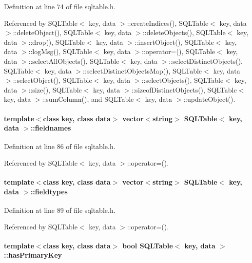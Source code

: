 Definition at line 74 of file sqltable.h.

Referenced by SQLTable$<$ key, data $>$::create\-Indices(), SQLTable$<$ key, data $>$::delete\-Object(), SQLTable$<$ key, data $>$::delete\-Objects(), SQLTable$<$ key, data $>$::drop(), SQLTable$<$ key, data $>$::insert\-Object(), SQLTable$<$ key, data $>$::log\-Msg(), SQLTable$<$ key, data $>$::operator=(), SQLTable$<$ key, data $>$::select\-All\-Objects(), SQLTable$<$ key, data $>$::select\-Distinct\-Objects(), SQLTable$<$ key, data $>$::select\-Distinct\-Objects\-Map(), SQLTable$<$ key, data $>$::select\-Object(), SQLTable$<$ key, data $>$::select\-Objects(), SQLTable$<$ key, data $>$::size(), SQLTable$<$ key, data $>$::sizeof\-Distinct\-Objects(), SQLTable$<$ key, data $>$::sum\-Column(), and SQLTable$<$ key, data $>$::update\-Object().\hypertarget{classSQLTable_SQLTableo5}{
\paragraph[fieldnames]{\setlength{\rightskip}{0pt plus 5cm}template$<$class key, class data$>$ vector$<$string$>$ SQLTable$<$ key, data $>$::fieldnames}\hfill}
\label{classSQLTable_SQLTableo5}




Definition at line 86 of file sqltable.h.

Referenced by SQLTable$<$ key, data $>$::operator=().\hypertarget{classSQLTable_SQLTableo6}{
\paragraph[fieldtypes]{\setlength{\rightskip}{0pt plus 5cm}template$<$class key, class data$>$ vector$<$string$>$ SQLTable$<$ key, data $>$::fieldtypes}\hfill}
\label{classSQLTable_SQLTableo6}




Definition at line 89 of file sqltable.h.

Referenced by SQLTable$<$ key, data $>$::operator=().\hypertarget{classSQLTable_SQLTableo8}{
\paragraph[hasPrimaryKey]{\setlength{\rightskip}{0pt plus 5cm}template$<$class key, class data$>$ bool SQLTable$<$ key, data $>$::has\-Primary\-Key}\hfill}
\label{classSQLTable_SQLTableo8}




